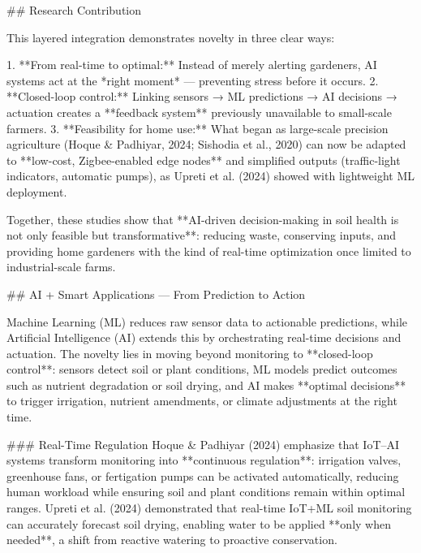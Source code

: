 \documentclass{sigchi}
\begin{document}
## Research Contribution

This layered integration demonstrates novelty in three clear ways:

1. **From real-time to optimal:** Instead of merely alerting gardeners, AI systems act at the *right moment* — preventing stress before it occurs.  
2. **Closed-loop control:** Linking sensors → ML predictions → AI decisions → actuation creates a **feedback system** previously unavailable to small-scale farmers.  
3. **Feasibility for home use:** What began as large-scale precision agriculture (Hoque & Padhiyar, 2024; Sishodia et al., 2020) can now be adapted to **low-cost, Zigbee-enabled edge nodes** and simplified outputs (traffic-light indicators, automatic pumps), as Upreti et al. (2024) showed with lightweight ML deployment.  

Together, these studies show that **AI-driven decision-making in soil health is not only feasible but transformative**: reducing waste, conserving inputs, and providing home gardeners with the kind of real-time optimization once limited to industrial-scale farms.

## AI + Smart Applications — From Prediction to Action

Machine Learning (ML) reduces raw sensor data to actionable predictions, while Artificial Intelligence (AI) extends this by orchestrating real-time decisions and actuation.  
The novelty lies in moving beyond monitoring to **closed-loop control**: sensors detect soil or plant conditions, ML models predict outcomes such as nutrient degradation or soil drying, and AI makes **optimal decisions** to trigger irrigation, nutrient amendments, or climate adjustments at the right time.

### Real-Time Regulation
Hoque & Padhiyar (2024) emphasize that IoT–AI systems transform monitoring into **continuous regulation**: irrigation valves, greenhouse fans, or fertigation pumps can be activated automatically, reducing human workload while ensuring soil and plant conditions remain within optimal ranges.  
Upreti et al. (2024) demonstrated that real-time IoT+ML soil monitoring can accurately forecast soil drying, enabling water to be applied **only when needed**, a shift from reactive watering to proactive conservation.
\end{document}
